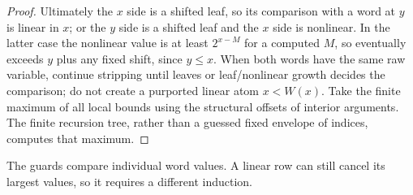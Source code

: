 \begin{proof}
Ultimately the $x$ side is a shifted leaf, so its comparison with a word
at $y$ is linear in $x$; or the $y$ side is a shifted leaf and the $x$
side is nonlinear. In the latter case the nonlinear value is at least
$2^{x-M}$ for a computed $M$, so eventually exceeds $y$ plus any fixed
shift, since $y\le x$. When both words have the same raw variable,
continue stripping until leaves or leaf/nonlinear growth decides the
comparison; do not create a purported linear atom $x<W(x)$.
Take the finite maximum of all local bounds using the structural offsets
of interior arguments. The finite recursion tree, rather than a guessed
fixed envelope of indices, computes that maximum.
\end{proof}

The guards compare individual word values. A linear row can still cancel
its largest values, so it requires a different induction.

